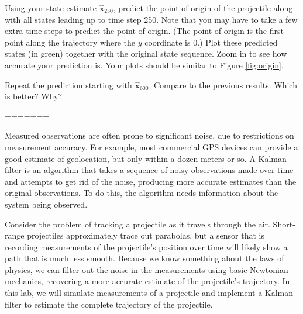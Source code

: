 \begin{problem}
Using your state estimate $\widehat{\mathbf{x}}_{250}$, predict the point of origin of the projectile along with
all states leading up to time step 250. Note that you may have to take a few extra time steps to predict the point of origin.
(The point of origin is the first point along the trajectory where the $y$ coordinate is 0.)
Plot these predicted states (in green) together with the original state sequence.
Zoom in to see how accurate your prediction is.
Your plots should be similar to Figure \ref{fig:origin}.
\label{prob:origin_pt}

Repeat the prediction starting with $\widehat{\mathbf{x}}_{600}$.  
Compare to the previous results.  
Which is better?  
Why?
\end{problem}
=======

Measured observations are often prone to significant noise, due to restrictions on measurement accuracy.
For example, most commercial GPS devices can provide a good estimate of geolocation, but only within a dozen meters or so.
A Kalman filter is an algorithm that takes a sequence of noisy observations made over time and attempts to get rid of the noise,
producing more accurate estimates than the original observations.
To do this, the algorithm needs information about the system being observed.

Consider the problem of tracking a projectile as it travels through the air.
Short-range projectiles approximately trace out parabolas, but a sensor that is recording measurements of the projectile's position over time will likely show a path that is much
less smooth.
Because we know something about the laws of physics, we can filter out the noise in the measurements using basic Newtonian mechanics, recovering a more accurate estimate
of the projectile's trajectory.
In this lab, we will simulate measurements of a projectile and implement a Kalman filter to estimate the complete trajectory of the projectile.

